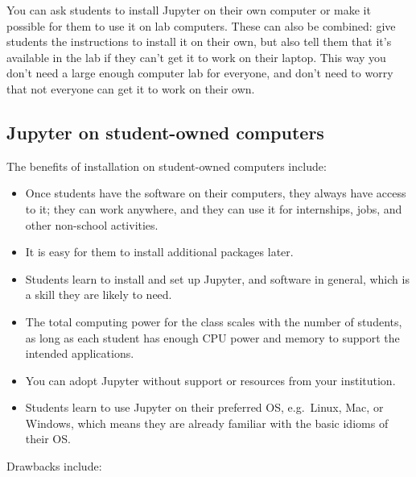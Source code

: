 \documentclass[]{book}
\begin{document}
You can ask students to install Jupyter on their own computer or make it
possible for them to use it on lab computers. These can also be combined: give
students the instructions to install it on their own, but also tell them that
it's available in the lab if they can't get it to work on their laptop. This
way you don't need a large enough computer lab for everyone, and don't need to
worry that not everyone can get it to work on their own.

\hypertarget{jupyter-on-student-owned-computers}{%
\subsection{Jupyter on student-owned computers}\label{jupyter-on-student-owned-computers}}

The benefits of installation on student-owned computers include:

\begin{itemize}
\item
  Once students have the software on their computers, they always have
  access to it; they can work anywhere, and they can use it for
  internships, jobs, and other non-school activities.
\item
  It is easy for them to install additional packages later.
\item
  Students learn to install and set up Jupyter, and software in
  general, which is a skill they are likely to need.
\item
  The total computing power for the class scales with the number of
  students, as long as each student has enough CPU power and memory
  to support the intended applications.
\item
  You can adopt Jupyter without support or resources from your
  institution.
\item
  Students learn to use Jupyter on their preferred OS, e.g.~Linux,
  Mac, or Windows, which means they are already familiar with the
  basic idioms of their OS.
\end{itemize}

Drawbacks include:
\end{document}
